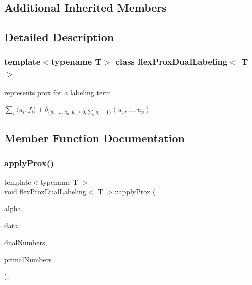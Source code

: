 \subsection*{Additional Inherited Members}


\subsection{Detailed Description}
\subsubsection*{template$<$typename T$>$\newline
class flex\+Prox\+Dual\+Labeling$<$ T $>$}

represents prox for a labeling term 

$ \sum_i \langle u_i,f_i\rangle + \delta_{ \{\bar{u}_1,\ldots,\bar{u}_n : \bar{u}_i \geq 0, \sum_i u_i = 1 \}}(u_1,\ldots,u_n) $ 

\subsection{Member Function Documentation}
\mbox{\label{classflex_prox_dual_labeling_a29e89f413ea586b9390da273141c823b}} 
\subsubsection{\texorpdfstring{apply\+Prox()}{applyProx()}\hspace{0.1cm}{\footnotesize\ttfamily [1/2]}}
{\footnotesize\ttfamily template$<$typename T $>$ \\
void \hyperlink{classflex_prox_dual_labeling}{flex\+Prox\+Dual\+Labeling}$<$ T $>$\+::apply\+Prox (\begin{DoxyParamCaption}\item[{T}]{alpha,  }\item[{\hyperlink{classflex_box_data}{flex\+Box\+Data}$<$ T $>$ $\ast$}]{data,  }\item[{const std\+::vector$<$ int $>$ \&}]{dual\+Numbers,  }\item[{const std\+::vector$<$ int $>$ \&}]{primal\+Numbers }\end{DoxyParamCaption})\hspace{0.3cm}{\ttfamily [inline]}, {\ttfamily [virtual]}}



